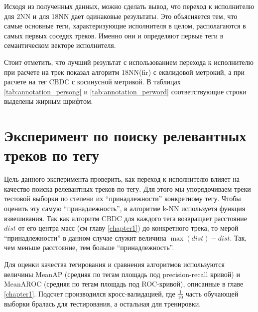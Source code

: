 Исходя из полученных данных, можно сделать вывод, что переход к исполнителю для 2NN и для 18NN дает одинаковые результаты. Это объясняется тем, что самые основные теги, характеризующие исполнителя в целом, 
располагаются в самых первых соседях треков. Именно они и определяют первые теги в семантическом векторе исполнителя.

Стоит отметить, что лучший результат с использованием перехода к исполнителю при расчете на трек показал алгоритм 18NN(fir) с еквлидовой метрокий, а при расчете на тег \ld CBDC с косинусной метрикой.
В таблицах \ref{tab:annotation_persong} и \ref{tab:annotation_perword} соответствующие строки выделены жирным шрифтом.

\section{Эксперимент по поиску релевантных треков по тегу}

Цель данного эксперимента \ld проверить, как переход к исполнителю влияет на качество поиска релевантных треков по тегу.
Для этого мы упорядочиваем треки тестовой выборки по степени их ``принадлежности'' конкретному тегу. Чтобы оценить эту самую ``принадлежность'', в алгоритме k-NN используетя функция взвешивания.
Так как алгоритм CBDC для каждого тега возвращает расстояние $dist$ от его центра масс (см главу \ref{chapter1}) до конкретного трека, то мерой ``принадлежности'' в данном случае служит величина
$\max(dist) - dist$. Так, чем меньше расстояние, тем больше ``принадлежность''.

Для оценки качества тегирования и сравнения алгоритмов используются величины MeanAP (средняя по тегам площадь под precision-recall кривой) и MeanAROC (средняя по тегам площадь под ROC-кривой),
описанные в главе \ref{chapter1}. Подсчет производился кросс-валидацией, где $\frac{1}{10}$ часть обучающей выборки бралась для тестирования, а остальная \ld для тренировки.

